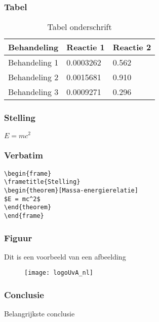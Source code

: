 \documentclass[aspectratio=43]{uva-inf-presentation}
\begin{document}

\begin{frame}
\frametitle{Tabel}
\begin{table}
\begin{tabular}{l l l}
\toprule
\textbf{Behandeling} & \textbf{Reactie 1} & \textbf{Reactie 2}\\
\midrule
Behandeling 1 & 0.0003262 & 0.562 \\
Behandeling 2 & 0.0015681 & 0.910 \\
Behandeling 3 & 0.0009271 & 0.296 \\
\bottomrule
\end{tabular}
\caption{Tabel onderschrift}
\end{table}
\end{frame}


\begin{frame}
\frametitle{Stelling}
\begin{theorem}
$E = mc^2$
\end{theorem}
\end{frame}


\begin{frame}[fragile]
\frametitle{Verbatim}
\begin{example}
\begin{verbatim}
\begin{frame}
\frametitle{Stelling}
\begin{theorem}[Massa-energierelatie]
$E = mc^2$
\end{theorem}
\end{frame}\end{verbatim}
\end{example}
\end{frame}


\begin{frame}
\frametitle{Figuur}
Dit is een voorbeeld van een afbeelding
\begin{figure}
\texttt{[image: logoUvA\_nl]}
\end{figure}
\end{frame}


\begin{frame}
\frametitle{Conclusie}
\Large{\centerline{Belangrijkste conclusie}}
\end{frame}
\end{document}
